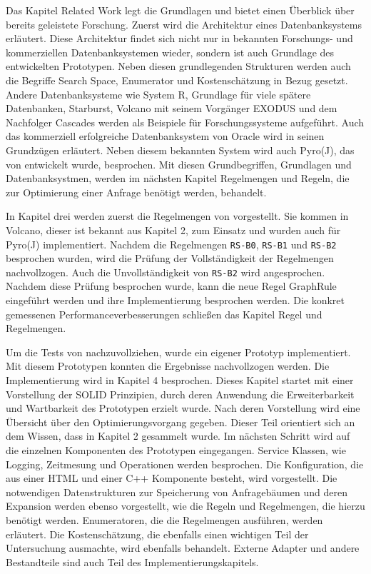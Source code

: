Das Kapitel Related Work legt die Grundlagen und bietet einen Überblick über bereits geleistete Forschung. Zuerst wird die Architektur eines Datenbanksystems erläutert. Diese Architektur findet sich nicht nur in bekannten Forschungs- und kommerziellen Datenbanksystemen wieder, sondern ist auch Grundlage des entwickelten Prototypen. Neben diesen grundlegenden Strukturen werden auch die Begriffe Search Space, Enumerator und Kostenschätzung in Bezug gesetzt. Andere Datenbanksysteme wie System R, Grundlage für viele spätere Datenbanken, Starburst, Volcano mit seinem Vorgänger EXODUS und dem Nachfolger Cascades werden als Beispiele für Forschungssysteme aufgeführt. Auch das kommerziell erfolgreiche Datenbanksystem von Oracle wird in seinen Grundzügen erläutert. Neben diesem bekannten System wird auch Pyro(J), das von \cite{roy2001multi} entwickelt wurde, besprochen. Mit diesen Grundbegriffen, Grundlagen und Datenbanksystmen, werden im nächsten Kapitel Regelmengen und Regeln, die zur Optimierung einer Anfrage benötigt werden, behandelt.

In Kapitel drei werden zuerst die Regelmengen von \cite{pellenkoft1997complexity} vorgestellt. Sie kommen in Volcano, dieser ist bekannt aus Kapitel 2, zum Einsatz und wurden auch für Pyro(J) implementiert. Nachdem die Regelmengen \texttt{RS-B0}, \texttt{RS-B1} und \texttt{RS-B2} besprochen wurden, wird die Prüfung der Vollständigkeit der Regelmengen nachvollzogen. Auch die Unvollständigkeit von \texttt{RS-B2} wird angesprochen. Nachdem diese Prüfung besprochen wurde, kann die neue Regel GraphRule eingeführt werden und ihre Implementierung besprochen werden. Die konkret gemessenen Performanceverbesserungen schließen das Kapitel Regel und Regelmengen.



Um die Tests von \cite{shanbhag2014optimizing} nachzuvollziehen, wurde ein eigener Prototyp implementiert. Mit diesem Prototypen konnten die Ergebnisse nachvollzogen werden. Die Implementierung wird in Kapitel 4 besprochen. Dieses Kapitel startet mit einer Vorstellung der SOLID Prinzipien, durch deren Anwendung die Erweiterbarkeit und Wartbarkeit des Prototypen erzielt wurde. Nach deren Vorstellung wird eine Übersicht über den Optimierungsvorgang gegeben. Dieser Teil orientiert sich an dem Wissen, dass in Kapitel 2 gesammelt wurde. Im nächsten Schritt wird auf die einzelnen Komponenten des Prototypen eingegangen. Service Klassen, wie Logging, Zeitmesung und Operationen werden besprochen. Die Konfiguration, die aus einer HTML und einer C++ Komponente besteht, wird vorgestellt. Die notwendigen Datenstrukturen zur Speicherung von Anfragebäumen und deren Expansion werden ebenso vorgestellt, wie die Regeln und Regelmengen, die hierzu benötigt werden. Enumeratoren, die die Regelmengen ausführen, werden erläutert. Die Kostenschätzung, die ebenfalls einen wichtigen Teil der Untersuchung ausmachte, wird ebenfalls behandelt. Externe Adapter und andere Bestandteile sind auch Teil des Implementierungskapitels.


